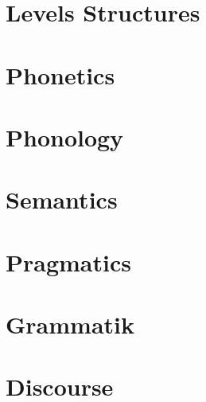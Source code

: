 \documentclass{article}
\begin{document}
\section{Levels Structures}


\section{Phonetics}



\section{Phonology}



\section{Semantics}





\section{Pragmatics}


\section{Grammatik}













\section{Discourse}



















% 
%
\end{document}
